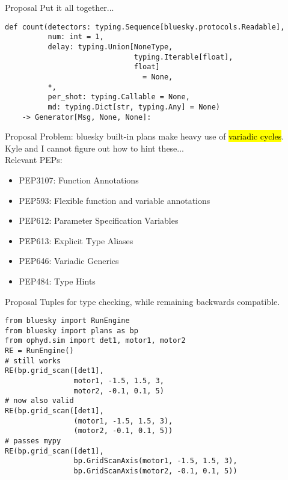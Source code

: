 \documentclass{presentation}
\begin{document}
\begin{frame}[fragile]{Proposal}
  Put it all together...

  \vfill

  \scriptsize
  \begin{verbatim}
def count(detectors: typing.Sequence[bluesky.protocols.Readable],
          num: int = 1,
          delay: typing.Union[NoneType,
                              typing.Iterable[float],
                              float]
                                = None,
          *,
          per_shot: typing.Callable = None,
          md: typing.Dict[str, typing.Any] = None)
    -> Generator[Msg, None, None]:
  \end{verbatim}

  \vfill
\end{frame}

\begin{frame}{Proposal}
  Problem: bluesky built-in plans make heavy use of \hl{variadic cycles}. \\
  Kyle and I cannot figure out how to hint these... \\
  Relevant PEPs:
  \begin{itemize}
    \item PEP3107: Function Annotations
    \item PEP593: Flexible function and variable annotations
    \item PEP612: Parameter Specification Variables
    \item PEP613: Explicit Type Aliases
    \item PEP646: Variadic Generics
    \item PEP484: Type Hints
  \end{itemize}
\end{frame}

\begin{frame}[fragile]{Proposal}
  Tuples for type checking, while remaining backwards compatible.
  \vfill

  \scriptsize
  \begin{verbatim}
from bluesky import RunEngine
from bluesky import plans as bp
from ophyd.sim import det1, motor1, motor2
RE = RunEngine()
# still works
RE(bp.grid_scan([det1],
                motor1, -1.5, 1.5, 3,
                motor2, -0.1, 0.1, 5)
# now also valid
RE(bp.grid_scan([det1],
                (motor1, -1.5, 1.5, 3),
                (motor2, -0.1, 0.1, 5))
# passes mypy
RE(bp.grid_scan([det1],
                bp.GridScanAxis(motor1, -1.5, 1.5, 3),
                bp.GridScanAxis(motor2, -0.1, 0.1, 5))


  \end{verbatim}
\end{frame}
\end{document}

